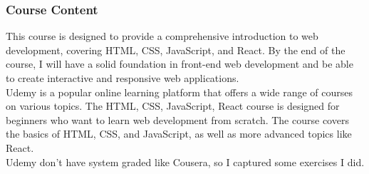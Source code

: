 \subsubsection{Course Content}
This course is designed to provide a comprehensive introduction to web development, covering HTML, CSS, JavaScript, and React. By the end of the course, I will have a solid foundation in front-end web development and be able to create interactive and responsive web applications.\\

Udemy is a popular online learning platform that offers a wide range of courses on various topics. The HTML, CSS, JavaScript, React course is designed for beginners who want to learn web development from scratch. The course covers the basics of HTML, CSS, and JavaScript, as well as more advanced topics like React.\\

Udemy don't have system graded like Cousera, so I captured some exercises I did.\\

